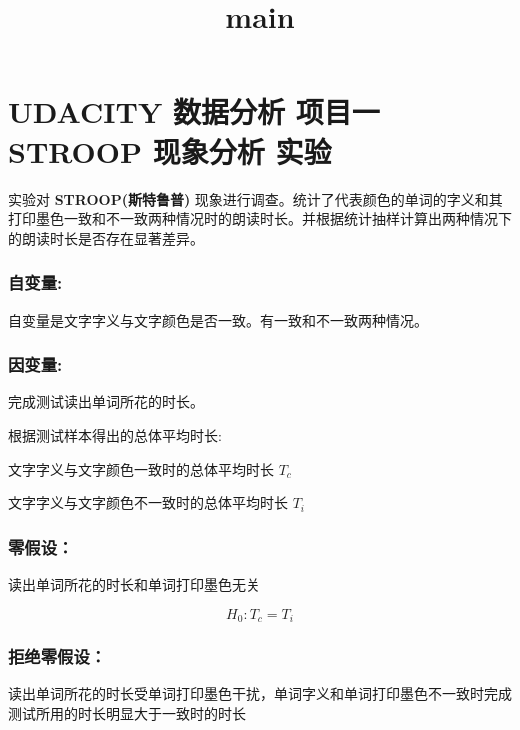 \documentclass[11pt]{article}
\title{main}
\begin{document}
    
    
    \maketitle
    
    

    
    \section{UDACITY 数据分析 项目一 STROOP 现象分析
实验}\label{udacity-ux6570ux636eux5206ux6790-ux9879ux76eeux4e00-stroop-ux73b0ux8c61ux5206ux6790-ux5b9eux9a8c}

    实验对 \textbf{STROOP(斯特鲁普)}
现象进行调查。统计了代表颜色的单词的字义和其打印墨色一致和不一致两种情况时的朗读时长。并根据统计抽样计算出两种情况下的朗读时长是否存在显著差异。

\subsubsection{自变量:}\label{ux81eaux53d8ux91cf}

自变量是文字字义与文字颜色是否一致。有一致和不一致两种情况。

\subsubsection{因变量:}\label{ux56e0ux53d8ux91cf}

完成测试读出单词所花的时长。

根据测试样本得出的总体平均时长:

文字字义与文字颜色一致时的总体平均时长 \(T_c\)

文字字义与文字颜色不一致时的总体平均时长 \(T_i\)

\subsubsection{零假设：}\label{ux96f6ux5047ux8bbe}

读出单词所花的时长和单词打印墨色无关

\[H_0: T_c = T_i\]

\subsubsection{拒绝零假设：}\label{ux62d2ux7eddux96f6ux5047ux8bbe}

读出单词所花的时长受单词打印墨色干扰，单词字义和单词打印墨色不一致时完成测试所用的时长明显大于一致时的时长
\end{document}
